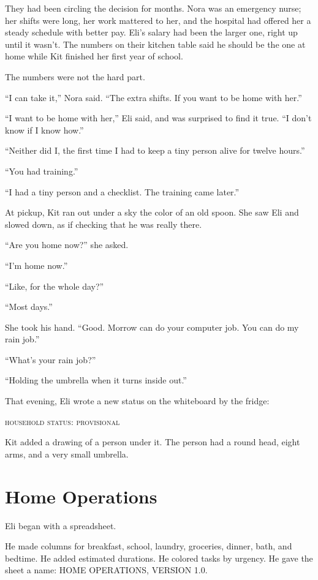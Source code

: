 \documentclass[11pt,openany]{book}
\begin{document}
They had been circling the decision for months. Nora was an emergency nurse; her shifts were long, her work mattered to her, and the hospital had offered her a steady schedule with better pay. Eli's salary had been the larger one, right up until it wasn't. The numbers on their kitchen table said he should be the one at home while Kit finished her first year of school.

The numbers were not the hard part.

``I can take it,'' Nora said. ``The extra shifts. If you want to be home with her.''

``I want to be home with her,'' Eli said, and was surprised to find it true. ``I don't know if I know how.''

``Neither did I, the first time I had to keep a tiny person alive for twelve hours.''

``You had training.''

``I had a tiny person and a checklist. The training came later.''

At pickup, Kit ran out under a sky the color of an old spoon. She saw Eli and slowed down, as if checking that he was really there.

``Are you home now?'' she asked.

``I'm home now.''

``Like, for the whole day?''

``Most days.''

She took his hand. ``Good. Morrow can do your computer job. You can do my rain job.''

``What's your rain job?''

``Holding the umbrella when it turns inside out.''

That evening, Eli wrote a new status on the whiteboard by the fridge:

\begin{center}
\textsc{household status: provisional}
\end{center}

Kit added a drawing of a person under it. The person had a round head, eight arms, and a very small umbrella.

\chapter{Home Operations}

Eli began with a spreadsheet.

He made columns for breakfast, school, laundry, groceries, dinner, bath, and bedtime. He added estimated durations. He colored tasks by urgency. He gave the sheet a name: HOME OPERATIONS, VERSION 1.0.
\end{document}
